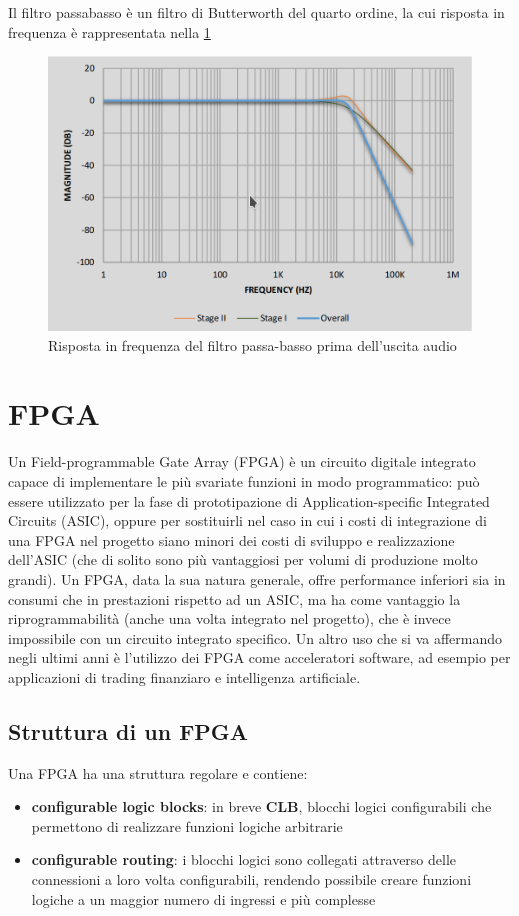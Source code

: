 Il filtro passabasso è un filtro di Butterworth del quarto ordine, la cui risposta
in frequenza è rappresentata nella \cref{fig:freq_resp}
\begin{figure}[h!]
	\centering
	\def\svgwidth{\columnwidth}
	\includegraphics[width=0.6\columnwidth]{TeX_files/freq_response.png}
    \caption{Risposta in frequenza del filtro passa-basso prima dell'uscita audio}
    \label{fig:freq_resp}
\end{figure}

\section{FPGA}
Un Field-programmable Gate Array (FPGA) è un circuito digitale integrato
capace di implementare le più svariate funzioni in modo programmatico:
può essere utilizzato per la fase di prototipazione di Application-specific
Integrated Circuits (ASIC), oppure per sostituirli nel caso in cui i costi
di integrazione di una FPGA nel progetto siano minori dei costi di sviluppo
e realizzazione dell'ASIC (che di solito sono più vantaggiosi per volumi
di produzione molto grandi).
Un FPGA, data la sua natura generale, offre performance inferiori sia
in consumi che in prestazioni rispetto ad un ASIC, ma ha come vantaggio
la riprogrammabilità (anche una volta integrato nel progetto), che
è invece impossibile con un circuito integrato specifico. 
Un altro uso che si va affermando negli ultimi anni è l'utilizzo dei
FPGA come acceleratori software, ad esempio per applicazioni di 
trading finanziaro e intelligenza artificiale.

\subsection{Struttura di un FPGA}
Una FPGA ha una struttura regolare e contiene:
\begin{itemize}
    \item \textbf{configurable logic blocks}: in breve \textbf{CLB}, blocchi
            logici configurabili che permettono di realizzare funzioni
            logiche arbitrarie
    \item \textbf{configurable routing}: i blocchi logici sono collegati
          attraverso delle connessioni a loro volta configurabili,
          rendendo possibile creare funzioni logiche a un maggior numero
          di ingressi e più complesse
\end{itemize}

